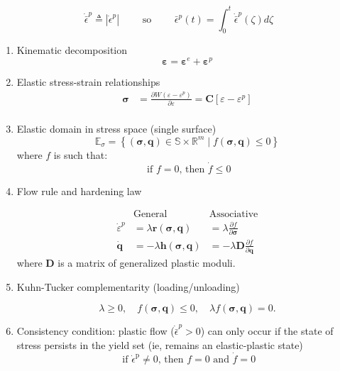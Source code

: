\[
\dot{\bar{\epsilon}}^p \triangleq \left|\dot{\epsilon}^p\right|
\qquad\text{ so }\qquad
\bar{\epsilon}^p(t) = \int_0^t \dot{\bar{\epsilon}}^p(\zeta) d \zeta
\]
\begin{marsdenbox}
    \begin{enumerate}
\def\labelenumi{\arabic{enumi}.}
\item Kinematic decomposition
\[
\boldsymbol{\varepsilon} = \boldsymbol{\varepsilon}^e + \boldsymbol{\varepsilon}^p
\]
\item
  Elastic stress-strain relationships \[
    \begin{aligned}
    \boldsymbol{\sigma} &=\frac{\partial W\left(\varepsilon-\varepsilon^{p}\right)}{\partial \varepsilon}=\mathbf{C}\left[\varepsilon-\varepsilon^{p}\right] \\
    \end{aligned}
    \]
\item
  Elastic domain in stress space (single surface) \[
  \mathbb{E}_{\sigma}=\left\{(\boldsymbol{\sigma}, \boldsymbol{q}) \in \mathbb{S} \times \mathbb{R}^{m} \mid f(\boldsymbol{\sigma}, \boldsymbol{q}) \leq 0\right\}
  \]
  where $f$ is such that:
  $$
  \text { if } f=0 \text {, then } \dot{f} \leq 0
  $$
\item
  Flow rule and hardening law

  \[
  \begin{aligned}
  & \text{General}  & \text{Associative} \\
  \dot{\varepsilon}^{p} &=\lambda \boldsymbol{r}(\boldsymbol{\sigma}, \boldsymbol{q}) &=\lambda \frac{\partial f}{\partial \boldsymbol{\sigma}}  \\
  \dot{\boldsymbol{q}} &=-\lambda \boldsymbol{h}(\boldsymbol{\sigma}, \boldsymbol{q}) &= -\lambda \mathbf{D} \frac{\partial f}{\partial \boldsymbol{q}}
  \end{aligned}
  \]
  where \(\mathbf{D}\) is a matrix of generalized plastic moduli.
\item
  Kuhn-Tucker complementarity (loading/unloading)
  
\[
  \lambda \geq 0, \quad f(\boldsymbol{\sigma}, \boldsymbol{q}) \leq 0, \quad \lambda f(\boldsymbol{\sigma}, \boldsymbol{q})=0 .
\]

\item
  Consistency condition: plastic flow ($\dot{\bar{\epsilon}}^p>0$) can only occur if the state of stress persists in the yield set (ie,  remains an elastic-plastic state)
    $$
    \text { if } \dot{\epsilon}^{\mathrm{p}} \neq 0 \text {, then } f=0 \text { and } \dot{f}=0
    $$ 
\end{enumerate}
\end{marsdenbox}


